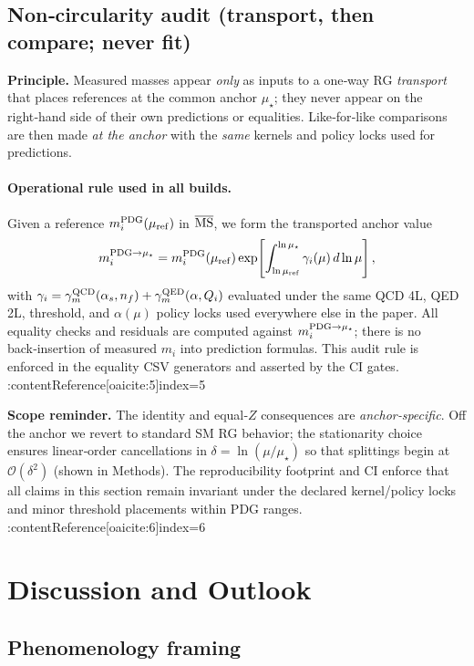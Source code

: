 \documentclass[epjc3]{svjour3}
\begin{document}
\subsection{Non‑circularity audit (transport, then compare; never fit)}
\noindent\textbf{Principle.} Measured masses appear \emph{only} as inputs to a one‑way RG \emph{transport} that places references at the common anchor $\mu_\star$; they never appear on the right‑hand side of their own predictions or equalities. Like‑for‑like comparisons are then made \emph{at the anchor} with the \emph{same} kernels and policy locks used for predictions.

\paragraph{Operational rule used in all builds.}
Given a reference $m_i^{\rm PDG}(\mu_{\rm ref})$ in $\overline{\rm MS}$, we form the transported anchor value
\[
m_i^{\rm PDG\to\mu_\star}
= m_i^{\rm PDG}(\mu_{\rm ref})
  \exp\!\left[\int_{\ln\mu_{\rm ref}}^{\ln\mu_\star}\gamma_i(\mu)\,d\ln\mu\right],
\]
with $\gamma_i=\gamma^{\rm QCD}_m(\alpha_s,n_f)+\gamma^{\rm QED}_m(\alpha,Q_i)$ evaluated under the same QCD 4L, QED 2L, threshold, and $\alpha(\mu)$ policy locks used everywhere else in the paper. All equality checks and residuals are computed against $m_i^{\rm PDG\to\mu_\star}$; there is no back‑insertion of measured $m_i$ into prediction formulas. This audit rule is enforced in the equality CSV generators and asserted by the CI gates. :contentReference[oaicite:5]{index=5}

\medskip
\noindent\textbf{Scope reminder.} The identity and equal‑$Z$ consequences are \emph{anchor‑specific}. Off the anchor we revert to standard SM RG behavior; the stationarity choice ensures linear‑order cancellations in $\delta=\ln(\mu/\mu_\star)$ so that splittings begin at $\mathcal O(\delta^2)$ (shown in Methods). The reproducibility footprint and CI enforce that all claims in this section remain invariant under the declared kernel/policy locks and minor threshold placements within PDG ranges. :contentReference[oaicite:6]{index=6}

\section{Discussion and Outlook}

\subsection*{Phenomenology framing}
\end{document}
